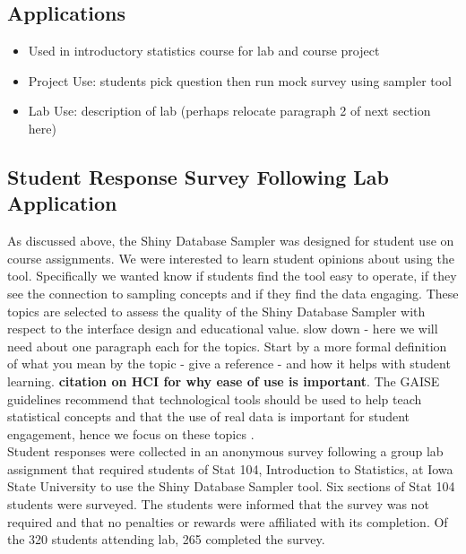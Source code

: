 \documentclass{article}\usepackage[]{graphicx}\usepackage[]{color}
\newcommand{\hh}[1]{{\color{ForestGreen} #1}}
\newcommand{\km}[1]{{\color{Orange} #1}}
\begin{document}
\vspace{.1in}

\subsection{Applications}

\begin{itemize}
\item Used in introductory statistics course for lab and course project
\item Project Use: students pick question then run mock survey using sampler tool
\item Lab Use: description of lab (perhaps relocate paragraph 2 of next section here)
\end{itemize}

\subsection{Student Response Survey Following Lab Application}

As discussed above, the Shiny Database Sampler was designed for student use on course assignments. We were interested to learn student opinions about using the tool. Specifically we wanted know if students find the tool easy to operate, if they see the connection to sampling concepts and if they find the data engaging. \km{These topics are selected to assess the quality of the Shiny Database Sampler with respect to the interface design and educational value.}
\hh{slow down - here we will need about one paragraph each for the topics. Start by a more formal definition of what you mean by the topic - give a reference - and how it helps with student learning. }
\km{\textbf{citation on HCI for why ease of use is important}.  The GAISE guidelines recommend that technological tools should be used to help teach statistical concepts and that the use of real data is important for student engagement, hence we focus on these topics \citep{GAISEcollege}. } \\

Student responses were collected in an anonymous survey following a group lab assignment that required students of Stat 104, Introduction to Statistics, at Iowa State University to use the Shiny Database Sampler tool. Six sections of Stat 104 students were surveyed. The students were informed that the survey was not required and that no penalties or rewards were affiliated with its completion.  Of the 320 students attending lab, 265 completed the survey. 
\end{document}
